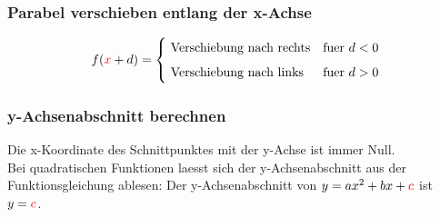 \begin{multicols}{2}
    \subsubsection{Parabel verschieben entlang der x-Achse}
    \vspace{-4mm}
    \begin{equation*} f({\color{red}x} + d) = \begin{cases} \text{ Verschiebung nach rechts} &\text{fuer } d < 0 \\[5px] \text{ Verschiebung nach links} &\text{fuer } d > 0 \end{cases} \end{equation*}

    \subsubsection{y-Achsenabschnitt berechnen}
    \vspace{-4mm}
    Die x-Koordinate des Schnittpunktes mit der y-Achse ist immer Null. \\
    Bei quadratischen Funktionen laesst sich der y-Achsenabschnitt aus der Funktionsgleichung ablesen: Der y-Achsenabschnitt von $y = ax^2 + bx + {\color{red}c}$ ist $y = {\color{red}c}$.

\end{multicols}
